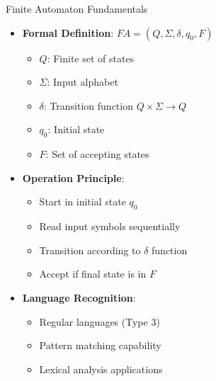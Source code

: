 \documentclass[aspectratio=169,11pt]{beamer}
\newcommand{\concept}[1]{\textbf{\color{accentcolor}#1}}
\begin{document}
\begin{frame}{Finite Automaton Fundamentals}
\begin{itemize}
\item \concept{Formal Definition}: $FA = (Q, \Sigma, \delta, q_0, F)$
\begin{itemize}
\item $Q$: Finite set of states
\item $\Sigma$: Input alphabet
\item $\delta$: Transition function $Q \times \Sigma \rightarrow Q$
\item $q_0$: Initial state
\item $F$: Set of accepting states
\end{itemize}
\vspace{0.5cm}
\item \concept{Operation Principle}:
\begin{itemize}
\item Start in initial state $q_0$
\item Read input symbols sequentially
\item Transition according to $\delta$ function
\item Accept if final state is in $F$
\end{itemize}
\vspace{0.3cm}
\item \concept{Language Recognition}:
\begin{itemize}
\item Regular languages (Type 3)
\item Pattern matching capability
\item Lexical analysis applications
\end{itemize}
\end{itemize}
\end{frame}
\end{document}
